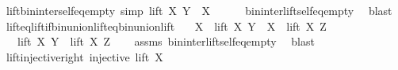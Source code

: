 \begin{isabellebody}
%
\endisadelimproof
\isanewline
{}\isamarkupfalse%
\ lift{\isacharunderscore}{\kern0pt}bin{\isacharunderscore}{\kern0pt}inter{\isacharunderscore}{\kern0pt}self{\isacharunderscore}{\kern0pt}eq{\isacharunderscore}{\kern0pt}empty\ {\isacharbrackleft}{\kern0pt}simp{\isacharbrackright}{\kern0pt}{\isacharcolon}{\kern0pt}\ {\isachardoublequoteopen}lift\ X\ Y\ {\isasyminter}\ X\ {\isacharequal}{\kern0pt}\ {\isacharbraceleft}{\kern0pt}{\isacharbraceright}{\kern0pt}{\isachardoublequoteclose}\isanewline
%
\isadelimproof
\ \ %
\endisadelimproof
%
\isatagproof
{}\isamarkupfalse%
\ bin{\isacharunderscore}{\kern0pt}inter{\isacharunderscore}{\kern0pt}lift{\isacharunderscore}{\kern0pt}self{\isacharunderscore}{\kern0pt}eq{\isacharunderscore}{\kern0pt}empty\ \isamarkupfalse%
\ blast%
\endisatagproof
{\isafoldproof}%
%
\isadelimproof
\isanewline
%
\endisadelimproof
\isanewline
{}\isamarkupfalse%
\ lift{\isacharunderscore}{\kern0pt}eq{\isacharunderscore}{\kern0pt}lift{\isacharunderscore}{\kern0pt}if{\isacharunderscore}{\kern0pt}bin{\isacharunderscore}{\kern0pt}union{\isacharunderscore}{\kern0pt}lift{\isacharunderscore}{\kern0pt}eq{\isacharunderscore}{\kern0pt}bin{\isacharunderscore}{\kern0pt}union{\isacharunderscore}{\kern0pt}lift{\isacharcolon}{\kern0pt}\isanewline
\ \ \ {\isachardoublequoteopen}X\ {\isasymunion}\ lift\ X\ Y\ {\isacharequal}{\kern0pt}\ X\ {\isasymunion}\ lift\ X\ Z{\isachardoublequoteclose}\isanewline
\ \ \ {\isachardoublequoteopen}lift\ X\ Y\ {\isacharequal}{\kern0pt}\ lift\ X\ Z{\isachardoublequoteclose}\isanewline
%
\isadelimproof
\ \ %
\endisadelimproof
%
\isatagproof
{}\isamarkupfalse%
\ assms\ bin{\isacharunderscore}{\kern0pt}inter{\isacharunderscore}{\kern0pt}lift{\isacharunderscore}{\kern0pt}self{\isacharunderscore}{\kern0pt}eq{\isacharunderscore}{\kern0pt}empty\ \isamarkupfalse%
\ blast%
\endisatagproof
{\isafoldproof}%
%
\isadelimproof
%
\endisadelimproof
%
\isadelimdocument
%
\endisadelimdocument
%
\isatagdocument
%
\isamarkuptrue%
%
\endisatagdocument
{\isafolddocument}%
%
\isadelimdocument
%
\endisadelimdocument
{}\isamarkupfalse%
\ lift{\isacharunderscore}{\kern0pt}injective{\isacharunderscore}{\kern0pt}right{\isacharcolon}{\kern0pt}\ {\isachardoublequoteopen}injective\ {\isacharparenleft}{\kern0pt}lift\ X{\isacharparenright}{\kern0pt}{\isachardoublequoteclose}\isanewline
%
\isadelimproof
%
\endisadelimproof
%
\isatagproof

\end{isabellebody}
